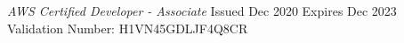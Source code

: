 \documentclass[12pt, line, margin]{res}
\begin{document}
\begin{resume}
\begin{multicols}{2}
{{{			{\sl  AWS Certified Developer - Associate} \newline
                		Issued Dec 2020 Expires Dec 2023 \newline
			Validation Number: H1VN45GDLJF4Q8CR
			}}}
 		\end{multicols}

%

\end{resume}
\end{document}
